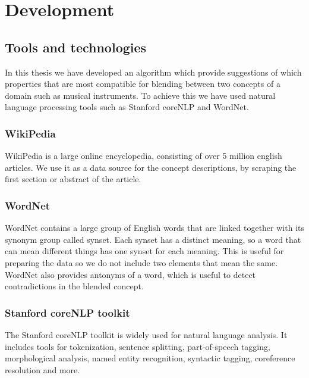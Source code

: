 
\chapter{Development} %

\label{Chapter4} %


\section{Tools and technologies}
In this thesis we have developed an algorithm which provide suggestions of which properties that are most compatible for blending between two concepts of a domain such as musical instruments. To achieve this we have used natural language processing tools such as Stanford coreNLP and WordNet.

\subsection{WikiPedia}
WikiPedia is a large online encyclopedia, consisting of over 5 million english articles. We use it as a data source for the concept descriptions, by scraping the first section or abstract of the article.

\subsection{WordNet}
WordNet contains a large group of English words that are linked together with its synonym group called synset. Each synset has a distinct meaning, so a word that can mean different things has one synset for each meaning. This is useful for preparing the data so we do not include two elements that mean the same. WordNet also provides antonyms of a word, which is useful to detect contradictions in the blended concept.

\subsection{Stanford coreNLP toolkit}
The Stanford coreNLP toolkit is widely used for natural language analysis. It includes tools for tokenization, sentence splitting, part-of-speech tagging, morphological analysis, named entity recognition, syntactic tagging, coreference resolution and more. \parencite{manning-EtAl:2014:P14-5}

